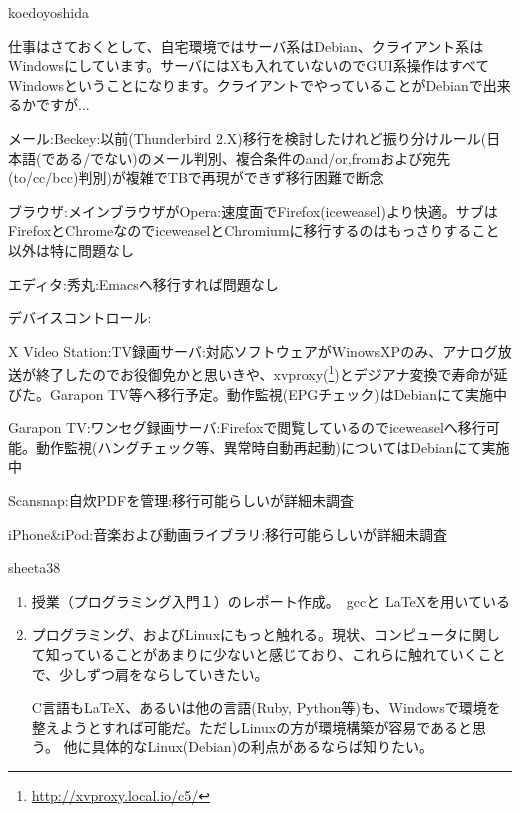 \begin{prework}{ koedoyoshida }

\begin{multicols}{2}
\begin{enumerate}
{\tiny
\item 仕事はさておくとして、自宅環境ではサーバ系はDebian、クライアント系はWindowsにしています。サーバにはXも入れていないのでGUI系操作はすべてWindowsということになります。クライアントでやっていることがDebianで出来るかですが...
  \begin{itemize}
{\tiny
  \item メール:Beckey:以前(Thunderbird 2.X)移行を検討したけれど振り分けルール(日本語(である/でない)のメール判別、複合条件のand/or,fromおよび宛先(to/cc/bcc)判別)が複雑でTBで再現ができず移行困難で断念
  \item ブラウザ:メインブラウザがOpera:速度面でFirefox(iceweasel)より快適。サブはFirefoxとChromeなのでiceweaselとChromiumに移行するのはもっさりすること以外は特に問題なし
  \item エディタ:秀丸:Emacsへ移行すれば問題なし
  \item デバイスコントロール:
    \begin{itemize}
{\tiny
    \item X Video Station:TV録画サーバ:対応ソフトウェアがWinowsXPのみ、アナログ放送が終了したのでお役御免かと思いきや、xvproxy(\footnote{\url{http://xvproxy.local.io/c5/}})とデジアナ変換で寿命が延びた。Garapon TV等へ移行予定。動作監視(EPGチェック)はDebianにて実施中
    \item Garapon TV:ワンセグ録画サーバ:Firefoxで閲覧しているのでiceweaselへ移行可能。動作監視(ハングチェック等、異常時自動再起動)についてはDebianにて実施中
    \item Scansnap:自炊PDFを管理:移行可能らしいが詳細未調査
    \item iPhone\&iPod:音楽および動画ライブラリ:移行可能らしいが詳細未調査
}
    \end{itemize}
}
  \end{itemize}
}
\end{enumerate}
\end{multicols}
\end{prework}

\begin{prework}{ sheeta38 }

\begin{enumerate}
\item 授業（プログラミング入門１）のレポート作成。　gccと \LaTeX を用いている
\item プログラミング、およびLinuxにもっと触れる。現状、コンピュータに関して知っていることがあまりに少ないと感じており、これらに触れていくことで、少しずつ肩をならしていきたい。

C言語も\LaTeX、あるいは他の言語(Ruby, Python等)も、Windowsで環境を整えようとすれば可能だ。ただしLinuxの方が環境構築が容易であると思う。
他に具体的なLinux(Debian)の利点があるならば知りたい。
\end{enumerate}

\end{prework}

